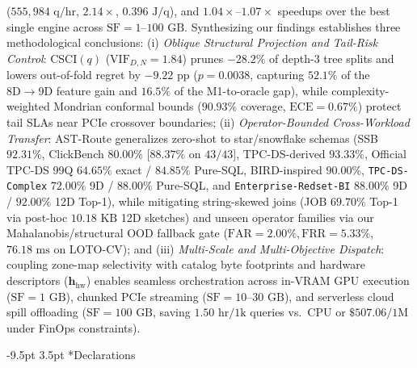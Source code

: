 \documentclass[10pt,a4paper]{article}
\makeatletter
\renewcommand\section{\@startsection{section}{1}{\z@}%
  {-9.5pt \@plus -2pt \@minus -1.5pt}%
  {3.5pt \@plus 1pt}%
  {\normalfont\large\bfseries}}
\makeatother
\begin{document}
($555{,}984\text{ q/hr}$, $2.14\times$, $0.396\text{ J/q}$), and $1.04\times\text{--}1.07\times$ speedups over the best single engine across $\text{SF}=1\text{--}100\text{ GB}$. Synthesizing our findings establishes three methodological conclusions: (i) \textit{Oblique Structural Projection and Tail-Risk Control}: $\text{CSCI}(q)$ ($\text{VIF}_{D,N}=1.84$) prunes $-28.2\%$ of depth-3 tree splits and lowers out-of-fold regret by $-9.22\text{ pp}$ ($p=0.0038$, capturing $52.1\%$ of the $8\text{D}\rightarrow 9\text{D}$ feature gain and $16.5\%$ of the M1-to-oracle gap), while complexity-weighted Mondrian conformal bounds ($90.93\%$ coverage, $\text{ECE}=0.67\%$) protect tail SLAs near PCIe crossover boundaries; (ii) \textit{Operator-Bounded Cross-Workload Transfer}: AST-Route generalizes zero-shot to star/snowflake schemas (SSB $92.31\%$, ClickBench $80.00\%$ [$88.37\%$ on $43/43$], TPC-DS-derived $93.33\%$, Official TPC-DS 99Q $64.65\%$ exact / $84.85\%$ Pure-SQL, BIRD-inspired $90.00\%$, \texttt{TPC-DS-Complex} $72.00\%$ 9D / $88.00\%$ Pure-SQL, and \texttt{Enterprise-Redset-BI} $88.00\%$ 9D / $92.00\%$ 12D Top-1), while mitigating string-skewed joins (JOB $69.70\%$ Top-1 via post-hoc $10.18\text{ KB}$ 12D sketches) and unseen operator families via our Mahalanobis/structural OOD fallback gate ($\text{FAR}=2.00\%, \text{FRR}=5.33\%$, $76.18\text{ ms}$ on LOTO-CV); and (iii) \textit{Multi-Scale and Multi-Objective Dispatch}: coupling zone-map selectivity with catalog byte footprints and hardware descriptors ($\mathbf{h}_{\text{hw}}$) enables seamless orchestration across in-VRAM GPU execution ($\text{SF}=1\text{ GB}$), chunked PCIe streaming ($\text{SF}=10\text{--}30\text{ GB}$), and serverless cloud spill offloading ($\text{SF}=100\text{ GB}$, saving $1.50\text{ hr}/1\text{k}$ queries vs.\ CPU or $\$507.06/1\text{M}$ under FinOps constraints).

\vspace{-8pt}
\section*{Declarations}
\enlargethispage{1.8\baselineskip}
\vspace{-5pt}
\end{document}
